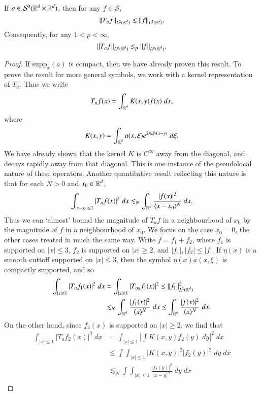 \begin{theorem}
    If $a \in \mathcal{S}^0(\operatorname{\mathbb{R}}^d \times \operatorname{\mathbb{R}}^d)$, then for any $f \in \mathcal{S}$,
    \[ \| T_af \|_{L^2(\operatorname{\mathbb{R}}^d)} \lesssim \| f \|_{L^2(\operatorname{\mathbb{R}}^d)}. \]
    Consequently, for any $1 < p < \infty$,
    \[ \| T_a f \|_{L^p(\operatorname{\mathbb{R}}^d)} \lesssim_p \| f \|_{L^p(\operatorname{\mathbb{R}}^d)}. \]
\end{theorem}
\begin{proof}
    If $\text{supp}_x(a)$ is compact, then we have already proven this result. To prove the result for more general symbols, we work with a kernel representation of $T_a$. Thus we write
    \[ T_af(x) = \int_{\operatorname{\mathbb{R}}^d} K(x,y) f(x)\; dx, \]
    where
    \[ K(x,y) = \int_{\operatorname{\mathbb{R}}^d} a(x,\xi) e^{2 \pi i \xi \cdot (x - y)}\; d\xi. \]
    We have already shown that the kernel $K$ is $C^\infty$ away from the diagonal, and decays rapidly away from that diagonal. This is one instance of the pseudolocal nature of these operators. Another quantitative result reflecting this nature is that for each $N > 0$ and $x_0 \in \operatorname{\mathbb{R}}^d$,
    \[ \int_{|x - x_0| \leq 1} |T_af(x)|^2\; dx \lesssim_N \int_{\operatorname{\mathbb{R}}^d} \frac{|f(x)|^2}{\langle x - x_0 \rangle^N}\; dx. \]
    Thus we can `almost' bound the magnitude of $T_af$ in a neighbourhood of $x_0$ by the magnitude of $f$ in a neighbourhood of $x_0$. We focus on the case $x_0 = 0$, the other cases treated in much the same way. Write $f = f_1 + f_2$, where $f_1$ is supported on $|x| \leq 3$, $f_2$ is supported on $|x| \geq 2$, and $|f_1|, |f_2| \leq |f|$. If $\eta(x)$ is a smooth cuttoff supported on $|x| \leq 3$, then the symbol $\eta(x) a(x,\xi)$ is compactly supported, and so
    \begin{align*}
        \int_{|x| \leq 1} |T_a f_1(x)|^2\; dx &= \int_{|x| \leq 1} |T_{\eta a} f_1(x)|^2 \lesssim \| f_1 \|_{L^2(\operatorname{\mathbb{R}}^d)}^2\\
        &\lesssim_N \int_{\operatorname{\mathbb{R}}^d} \frac{|f_1(x)|^2}{\langle x \rangle^N}\; dx \leq \int_{\operatorname{\mathbb{R}}^d} \frac{|f(x)|^2}{\langle x \rangle^N}\; dx.
    \end{align*}
    On the other hand, since $f_2(x)$ is supported on $|x| \geq 2$, we find that
    \begin{align*}
        \int_{|x| \leq 1} |T_a f_2(x)|^2\; dx &= \int_{|x| \leq 1} \left| \int K(x,y) f_2(y)\; dy \right|^2\; dx\\
        &\leq \int \int_{|x| \leq 1} |K(x,y)|^2 |f_2(y)|^2\; dy\; dx\\
        &\lesssim_N \int \int_{|x| \leq 1} \frac{|f_2(y)|^2}{|x - y|^N}\; dy\; dx\\

\end{align*}
\end{proof}
